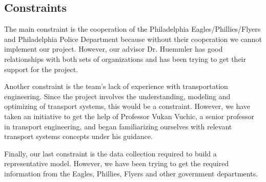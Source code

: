 \subsection{Constraints}
The main constraint is the cooperation of the Philadelphia
Eagles/Phillies/Flyers and Philadelphia Police Department because without
their cooperation we cannot implement our project. However, our
advisor Dr. Huemmler has good relationships with both sets of organizations
and has been trying to get their support for the project.

Another constraint is the team’s lack of experience with
transportation engineering.  Since the project involves the
understanding, modeling and optimizing of transport systems, this
would be a constraint. However, we have taken an initiative to get the
help of Professor Vukan Vuchic, a senior professor in transport
engineering, and began familiarizing ourselves with relevant transport
systems concepts under his guidance.

Finally, our last constraint is the data collection required to build
a representative model. However, we have been trying to get the
required information from the Eagles, Phillies, Flyers and other government
departments.

